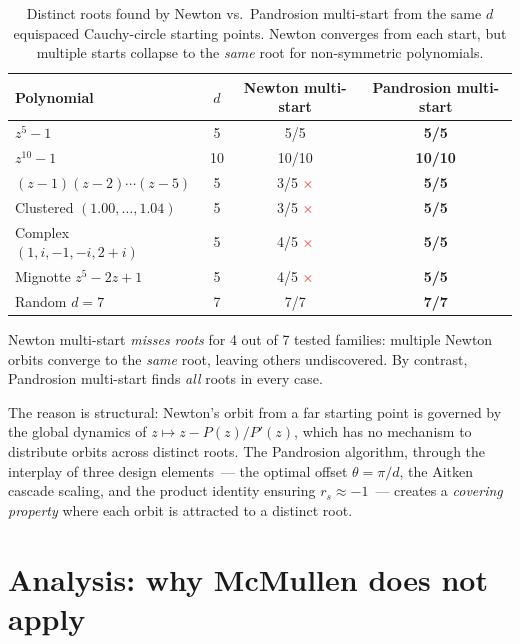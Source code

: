 \documentclass[10pt,a4paper,oneside]{book}
\theoremstyle{definition}
\theoremstyle{remark}
\begin{document}
\begin{table}[h]
\centering
\caption{Distinct roots found by Newton vs.\ Pandrosion multi-start from the same $d$ equispaced Cauchy-circle starting points.  Newton converges from each start, but multiple starts collapse to the \emph{same} root for non-symmetric polynomials.}
\label{tab:multistart_comparison}
\begin{tabular}{l c cc}
\toprule
Polynomial & $d$ & Newton multi-start & Pandrosion multi-start \\
\midrule
$z^5 - 1$ & 5 & 5/5 & \textbf{5/5} \\
$z^{10} - 1$ & 10 & 10/10 & \textbf{10/10} \\
\midrule
$(z-1)(z-2)\cdots(z-5)$ & 5 & 3/5 \textcolor{red}{$\times$} & \textbf{5/5} \\
Clustered $(1.00, \ldots, 1.04)$ & 5 & 3/5 \textcolor{red}{$\times$} & \textbf{5/5} \\
Complex $(1, i, -1, -i, 2{+}i)$ & 5 & 4/5 \textcolor{red}{$\times$} & \textbf{5/5} \\
Mignotte $z^5 - 2z + 1$ & 5 & 4/5 \textcolor{red}{$\times$} & \textbf{5/5} \\
Random $d=7$ & 7 & 7/7 & \textbf{7/7} \\
\bottomrule
\end{tabular}
\end{table}

Newton multi-start \emph{misses roots} for 4 out of 7 tested families: multiple Newton orbits converge to the \emph{same} root, leaving others undiscovered.  By contrast, Pandrosion multi-start finds \emph{all} roots in every case.

The reason is structural: Newton's orbit from a far starting point is governed by the global dynamics of $z \mapsto z - P(z)/P'(z)$, which has no mechanism to distribute orbits across distinct roots.  The Pandrosion algorithm, through the interplay of three design elements~--- the optimal offset $\theta = \pi/d$, the Aitken cascade scaling, and the product identity ensuring $r_s \approx -1$~--- creates a \emph{covering property} where each orbit is attracted to a distinct root.

\section{Analysis: why McMullen does not apply}
\label{sec:analysis}
\end{document}

